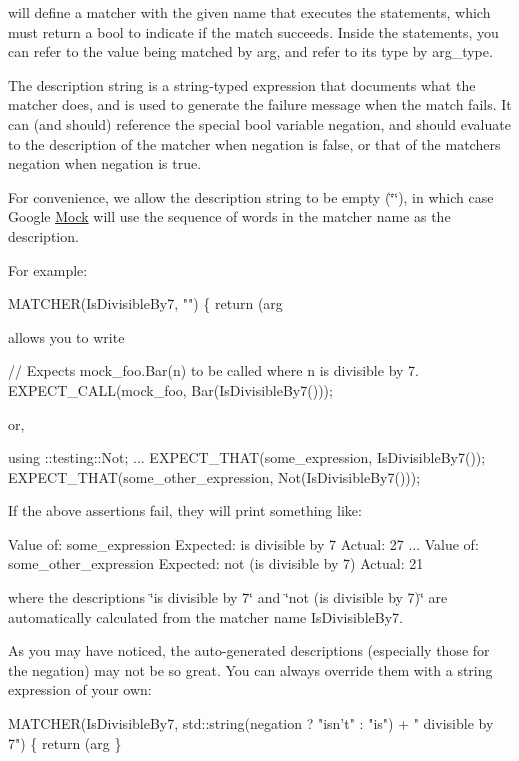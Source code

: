 will define a matcher with the given name that executes the statements, which must return a {\ttfamily bool} to indicate if the match succeeds. Inside the statements, you can refer to the value being matched by {\ttfamily arg}, and refer to its type by {\ttfamily arg\+\_\+type}.

The description string is a {\ttfamily string}-\/typed expression that documents what the matcher does, and is used to generate the failure message when the match fails. It can (and should) reference the special {\ttfamily bool} variable {\ttfamily negation}, and should evaluate to the description of the matcher when {\ttfamily negation} is {\ttfamily false}, or that of the matcher\textquotesingle{}s negation when {\ttfamily negation} is {\ttfamily true}.

For convenience, we allow the description string to be empty ({\ttfamily \char`\"{}\char`\"{}}), in which case Google \hyperlink{class_mock}{Mock} will use the sequence of words in the matcher name as the description.

For example\+: 
\begin{DoxyCode}
MATCHER(IsDivisibleBy7, "") \{ return (arg %
\end{DoxyCode}
 allows you to write 
\begin{DoxyCode}
// Expects mock\_foo.Bar(n) to be called where n is divisible by 7.
EXPECT\_CALL(mock\_foo, Bar(IsDivisibleBy7()));
\end{DoxyCode}
 or, 
\begin{DoxyCode}
using ::testing::Not;
...
  EXPECT\_THAT(some\_expression, IsDivisibleBy7());
  EXPECT\_THAT(some\_other\_expression, Not(IsDivisibleBy7()));
\end{DoxyCode}
 If the above assertions fail, they will print something like\+: 
\begin{DoxyCode}
  Value of: some\_expression
  Expected: is divisible by 7
    Actual: 27
...
  Value of: some\_other\_expression
  Expected: not (is divisible by 7)
    Actual: 21
\end{DoxyCode}
 where the descriptions {\ttfamily \char`\"{}is divisible by 7\char`\"{}} and {\ttfamily \char`\"{}not (is divisible
by 7)\char`\"{}} are automatically calculated from the matcher name {\ttfamily Is\+Divisible\+By7}.

As you may have noticed, the auto-\/generated descriptions (especially those for the negation) may not be so great. You can always override them with a string expression of your own\+: 
\begin{DoxyCode}
MATCHER(IsDivisibleBy7, std::string(negation ? "isn't" : "is") +
                        " divisible by 7") \{
  return (arg %
\}
\end{DoxyCode}


